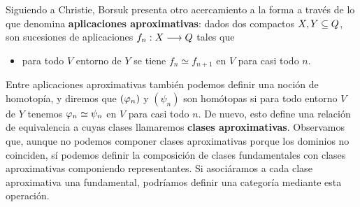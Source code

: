 Siguiendo a Christie, Borsuk presenta otro acercamiento a la forma a través de lo que denomina \textbf{aplicaciones aproximativas}: dados dos compactos $ X,Y\subseteq Q  $, son sucesiones de aplicaciones $ f_n: X\longrightarrow Q  $ tales que 
\begin{itemize}
  \item[] para todo $ V  $ entorno de $ Y  $ se tiene $ f_n\simeq f_{n+1}  $ en $V$ para casi todo $ n $.
\end{itemize}
Entre aplicaciones aproximativas también podemos definir una noción de homotopía, y diremos que $ (\varphi_n) $ y $ (\psi_n) $ son homótopas si para todo entorno $ V  $ de $ Y  $ tenemos $ \varphi_n\simeq \psi_n  $ en $ V  $ para casi todo $ n  $. De nuevo, esto define una relación de equivalencia a cuyas clases llamaremos \textbf{clases aproximativas}. Observamos que, aunque no podemos componer clases aproximativas porque los dominios no coinciden, sí podemos definir la composición de clases fundamentales con clases aproximativas componiendo representantes. Si asociáramos a cada clase aproximativa una fundamental, podríamos definir una categoría mediante esta operación. 

